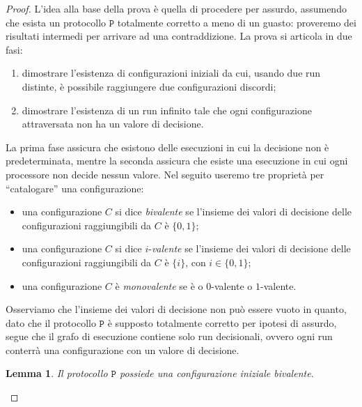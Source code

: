 \documentclass{article}
\newtheorem{lemma}{Lemma}
\begin{document}
\begin{proof}
  L'idea alla base della prova è quella di procedere per assurdo,
  assumendo che esista un protocollo $\mathtt{P}$ totalmente corretto a meno di
  un guasto: proveremo dei risultati intermedi per arrivare ad una
  contraddizione. La prova si articola in due fasi:
  \begin{enumerate}
  \item dimostrare l'esistenza di configurazioni iniziali da cui,
    usando due run distinte, è possibile raggiungere due
    configurazioni discordi;
  \item dimostrare l'esistenza di un run infinito tale che ogni
    configurazione attraversata non ha un valore di decisione.
  \end{enumerate}
  La prima fase assicura che esistono delle esecuzioni in cui la
  decisione non è predeterminata, mentre la seconda assicura che esiste
  una esecuzione in cui ogni processore non decide nessun valore.  Nel
  seguito useremo tre proprietà per ``catalogare'' una
  configurazione:
  \begin{itemize}
  \item una configurazione $C$ si dice \emph{bivalente} se l'insieme
    dei valori di decisione delle configurazioni raggiungibili da $C$
    è $\{0,1\}$;
  \item una configurazione $C$ si dice ${i}$-\emph{valente} se
    l'insieme dei valori di decisione delle configurazioni
    raggiungibili da $C$ è $\{i\}$, con $i\in \lbrace 0, 1
    \rbrace$;
  \item una configurazione $C$ è
    \emph{monovalente} se è o $0$-valente o $1$-valente.
  \end{itemize}

  Osserviamo che l'insieme dei valori di decisione non può essere
  vuoto in quanto, dato che il protocollo $\mathtt{P}$ è supposto totalmente
  corretto per ipotesi di assurdo, segue che il grafo di esecuzione
  contiene solo run decisionali, ovvero ogni run conterrà una
  configurazione con un valore di decisione.

\begin{lemma}
\label{lemma:bivalentInitialConfigurationExists}
Il protocollo $\mathtt{P}$ possiede una configurazione iniziale bivalente.
\end{lemma}


\end{proof}
\end{document}
